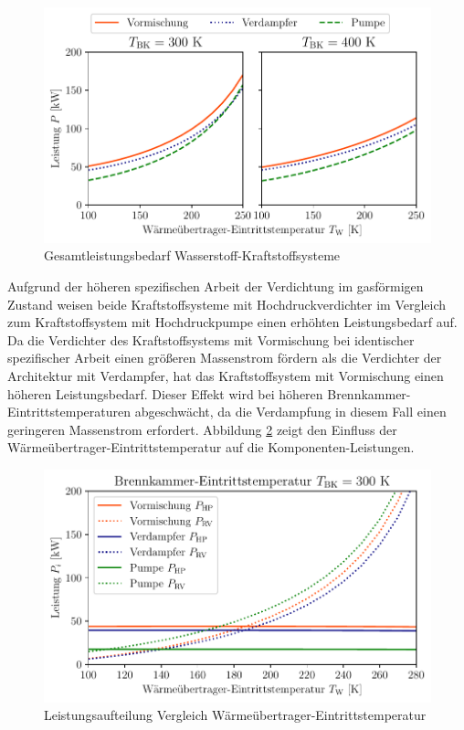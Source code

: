 \begin{figure}[ht]
\centering
\includegraphics[width=0.9\linewidth]{4_Abbildungen/2_Hauptteil/Ergebnisse/summary_power.pdf}
  \caption{Gesamtleistungsbedarf Wasserstoff-Kraftstoffsysteme}
  \label{fig:comp_power}
\end{figure}
\FloatBarrier

Aufgrund der höheren spezifischen Arbeit der Verdichtung im gasförmigen Zustand weisen beide Kraftstoffsysteme mit Hochdruckverdichter im Vergleich zum Kraftstoffsystem mit Hochdruckpumpe einen erhöhten Leistungsbedarf auf. Da die Verdichter des Kraftstoffsystems mit Vormischung bei identischer spezifischer Arbeit einen größeren Massenstrom  fördern als die Verdichter der Architektur mit Verdampfer, hat das Kraftstoffsystem mit Vormischung einen höheren Leistungsbedarf. Dieser Effekt wird bei höheren Brennkammer-Eintrittstemperaturen abgeschwächt, da die Verdampfung in diesem Fall einen geringeren Massenstrom erfordert. Abbildung \ref{fig:comp_split} zeigt den Einfluss der Wärmeübertrager-Eintrittstemperatur auf die Komponenten-Leistungen.

\begin{figure}[ht]
\centering
\includegraphics[width=0.85\linewidth]{4_Abbildungen/2_Hauptteil/Ergebnisse/300summary_powersplit.pdf}
  \caption{Leistungsaufteilung Vergleich Wärmeübertrager-Eintrittstemperatur}
  \label{fig:comp_split}
\end{figure}
\FloatBarrier

